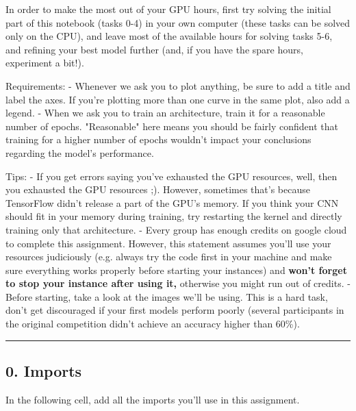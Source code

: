 \documentclass[11pt]{article}
\begin{document}
In order to make the most out of your GPU hours, first try solving the
initial part of this notebook (tasks 0-4) in your own computer (these
tasks can be solved only on the CPU), and leave most of the available
hours for solving tasks 5-6, and refining your best model further (and,
if you have the spare hours, experiment a bit!).

    Requirements: - Whenever we ask you to plot anything, be sure to add a
title and label the axes. If you're plotting more than one curve in the
same plot, also add a legend. - When we ask you to train an
architecture, train it for a reasonable number of epochs. "Reasonable"
here means you should be fairly confident that training for a higher
number of epochs wouldn't impact your conclusions regarding the model's
performance.

Tips: - If you get errors saying you've exhausted the GPU resources,
well, then you exhausted the GPU resources ;). However, sometimes that's
because TensorFlow didn't release a part of the GPU's memory. If you
think your CNN should fit in your memory during training, try restarting
the kernel and directly training only that architecture. - Every group
has enough credits on google cloud to complete this assignment. However,
this statement assumes you'll use your resources judiciously (e.g.
always try the code first in your machine and make sure everything works
properly before starting your instances) and \textbf{won't forget to
stop your instance after using it,} otherwise you might run out of
credits. - Before starting, take a look at the images we'll be using.
This is a hard task, don't get discouraged if your first models perform
poorly (several participants in the original competition didn't achieve
an accuracy higher than 60\%).

    \begin{center}\rule{0.5\linewidth}{\linethickness}\end{center}

\subsection{0. Imports}\label{imports}

In the following cell, add all the imports you'll use in this
assignment.
\end{document}
